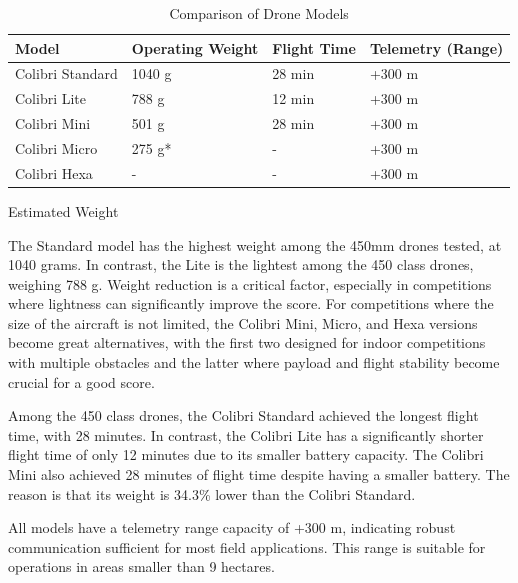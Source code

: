 \documentclass[conference]{IEEEtran}
\begin{document}
\begin{table}[htbp]
\centering
\caption{Comparison of Drone Models}
\label{tab:drone_comparison}
\begin{tabularx}{\columnwidth}{|l|X|X|X|}
\hline
\textbf{Model}         & \textbf{Operating Weight} & \textbf{Flight Time} & \textbf{Telemetry (Range)} \\ \hline
Colibri Standard       & 1040 g                    & 28 min               & +300 m                     \\ \hline
Colibri Lite           & 788 g                     & 12 min               & +300 m                     \\ \hline
Colibri Mini           & 501 g                     & 28 min               & +300 m                     \\ \hline
Colibri Micro          & 275 g*                    & -                    & +300 m                     \\ \hline
Colibri Hexa           & -                         & -                    & +300 m                     \\ \hline
\end{tabularx}
\newline
\small *Estimated Weight
\end{table}

The Standard model has the highest weight among the 450mm drones tested, at 1040 grams. In contrast, the Lite is the lightest among the 450 class drones, weighing 788 g. Weight reduction is a critical factor, especially in competitions where lightness can significantly improve the score. For competitions where the size of the aircraft is not limited, the Colibri Mini, Micro, and Hexa versions become great alternatives, with the first two designed for indoor competitions with multiple obstacles and the latter where payload and flight stability become crucial for a good score.

Among the 450 class drones, the Colibri Standard achieved the longest flight time, with 28 minutes. In contrast, the Colibri Lite has a significantly shorter flight time of only 12 minutes due to its smaller battery capacity. The Colibri Mini also achieved 28 minutes of flight time despite having a smaller battery. The reason is that its weight is 34.3\% lower than the Colibri Standard.

All models have a telemetry range capacity of +300 m, indicating robust communication sufficient for most field applications. This range is suitable for operations in areas smaller than 9 hectares.
\end{document}
